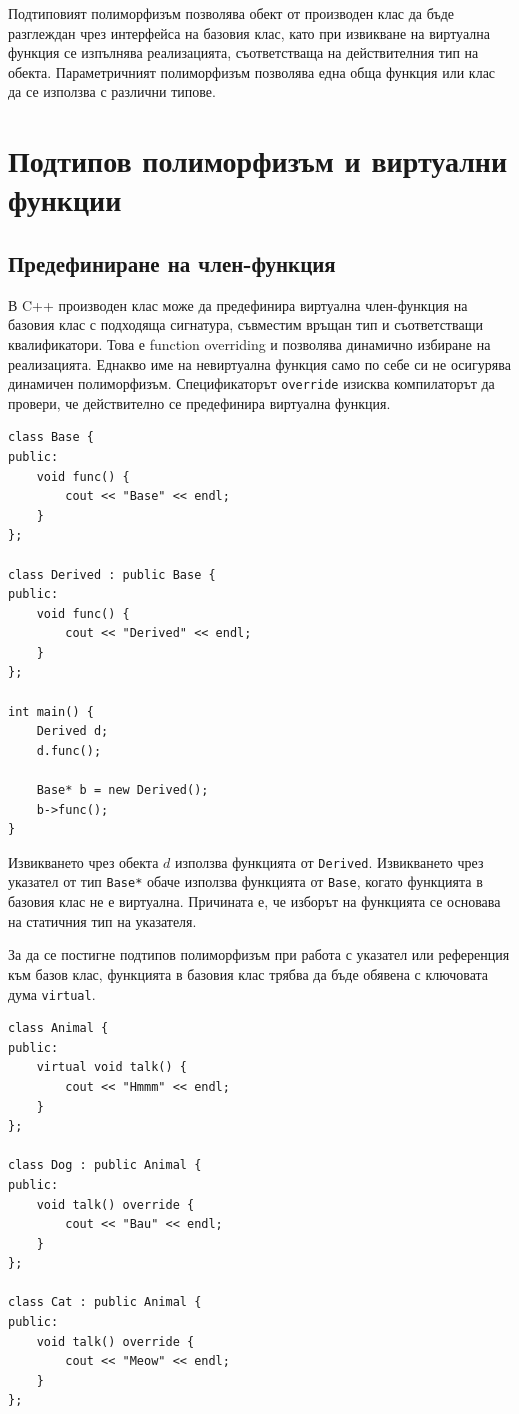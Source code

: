 Подтиповият полиморфизъм позволява обект от производен клас да бъде разглеждан чрез интерфейса на базовия клас, като при извикване на виртуална функция се изпълнява реализацията, съответстваща на действителния тип на обекта. Параметричният полиморфизъм позволява една обща функция или клас да се използва с различни типове.

\section{Подтипов полиморфизъм и виртуални функции}\label{s:17.2}

\subsection{Предефиниране на член-функция}\label{s:17.2.1}

\begin{defn}
В C++ производен клас може да предефинира виртуална член-функция на базовия клас с подходяща сигнатура, съвместим връщан тип и съответстващи квалификатори. Това е function overriding и позволява динамично избиране на реализацията. Еднакво име на невиртуална функция само по себе си не осигурява динамичен полиморфизъм. Спецификаторът \texttt{override} изисква компилаторът да провери, че действително се предефинира виртуална функция.
\end{defn}

\begin{verbatim}
class Base {
public:
    void func() {
        cout << "Base" << endl;
    }
};

class Derived : public Base {
public:
    void func() {
        cout << "Derived" << endl;
    }
};

int main() {
    Derived d;
    d.func();

    Base* b = new Derived();
    b->func();
}
\end{verbatim}

Извикването чрез обекта $d$ използва функцията от \texttt{Derived}. Извикването чрез указател от тип \texttt{Base*} обаче използва функцията от \texttt{Base}, когато функцията в базовия клас не е виртуална. Причината е, че изборът на функцията се основава на статичния тип на указателя.

За да се постигне подтипов полиморфизъм при работа с указател или референция към базов клас, функцията в базовия клас трябва да бъде обявена с ключовата дума \texttt{virtual}.

\begin{verbatim}
class Animal {
public:
    virtual void talk() {
        cout << "Hmmm" << endl;
    }
};

class Dog : public Animal {
public:
    void talk() override {
        cout << "Bau" << endl;
    }
};

class Cat : public Animal {
public:
    void talk() override {
        cout << "Meow" << endl;
    }
};
\end{verbatim}

